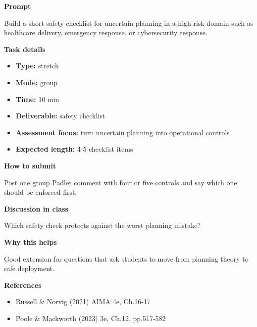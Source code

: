 \documentclass[11pt]{article}
\begin{document}
\begin{tcolorbox}[colback=white,colframe=MidnightBlue,title={Q6 Stretch Extension},fonttitle=\bfseries,breakable]
\begin{center}
\end{center}

{\large\bfseries\color{MidnightBlue} Prompt}\par\medskip
Build a short safety checklist for uncertain planning in a high-risk domain such as healthcare delivery, emergency response, or cybersecurity response.

{\large\bfseries\color{MidnightBlue} Task details}\par\medskip
\begin{itemize}\item \textbf{Type:} stretch
\item \textbf{Mode:} group
\item \textbf{Time:} 10 min
\item \textbf{Deliverable:} safety checklist
\item \textbf{Assessment focus:} turn uncertain planning into operational controls
\item \textbf{Expected length:} 4-5 checklist items\end{itemize}

{\large\bfseries\color{MidnightBlue} How to submit}\par\medskip
Post one group Padlet comment with four or five controls and say which one should be enforced first.

{\large\bfseries\color{MidnightBlue} Discussion in class}\par\medskip
Which safety check protects against the worst planning mistake?

{\large\bfseries\color{MidnightBlue} Why this helps}\par\medskip
Good extension for questions that ask students to move from planning theory to safe deployment.

{\large\bfseries\color{MidnightBlue} References}\par\medskip
\begin{itemize}\item Russell \& Norvig (2021) AIMA 4e, Ch.16-17
\item Poole \& Mackworth (2023) 3e, Ch.12, pp.517-582\end{itemize}
\end{tcolorbox}
\end{document}
